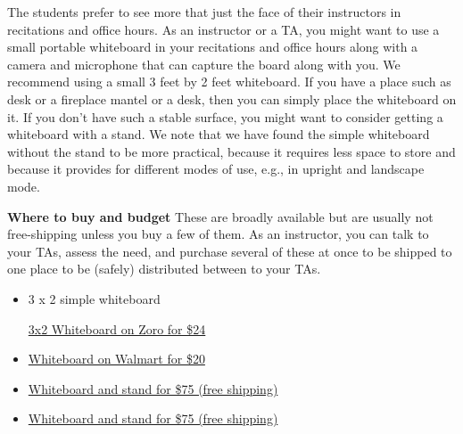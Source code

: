 \begin{gram}[Whiteboards]

The students prefer to see more that just the face of their
instructors in recitations and office hours. 
%
As an instructor or a TA, you might want to use a small portable
whiteboard in your recitations and office hours along with a camera
and microphone that can capture the board along with you. 
%
We recommend using a small 3 feet by 2 feet whiteboard.  
%
If you have a place such as desk or a fireplace mantel or a desk, then
you can simply place the whiteboard on it.  If you don't have such a
stable surface, you might want to consider getting a whiteboard with a
stand.
%
We note that we have found the simple whiteboard without the stand to
be more practical, because it requires less space to store and because
it provides for different modes of use, e.g., in upright and landscape
mode.


\textbf{Where to buy and budget}
These are broadly available but are usually not free-shipping unless you buy a few of them.  As an instructor,  you can talk to your TAs, assess the need, and purchase several of these at once to be shipped to one place to be (safely) distributed between to your TAs.
%

\begin{itemize}
\item
3 x 2 simple whiteboard

\href{https://www.zoro.com/zoro-select-dry-erase-board-36-w-silver-1nup9/i/G1291367/}{3x2
  Whiteboard on Zoro for \$24}

\item
\href{https://www.walmart.com/ip/Universal-Melamine-Dry-Erase-Board-36-x-24-Satin-Finished-Aluminum-Frame/21794195?wmlspartner=wlpa&selectedSellerId=1194&&adid=22222222227015737388&wl0=&wl1=g&wl2=c&wl3=52438033391&wl4=pla-83993817911&wl5=1025202&wl6=&wl7=&wl8=&wl9=pla&wl10=112550058&wl11=online&wl12=21794195&veh=sem&gclid=Cj0KCQjwhIP6BRCMARIsALu9Lfmsq_QIRmgF0rbJxUlILrtcELAuduVKI6z9GdzLxIafjLXdwYfXkmMaAoogEALw_wcB}
{Whiteboard on Walmart for \$20}

\item 
\href{https://www.shoplet.com/Universal-Adjustable-White-Board-Easel/UNV43033/spdv?pt=rk_frg_pla&gclid=Cj0KCQjwvvj5BRDkARIsAGD9vlIAZ8S65M9rY3gJkgpDk6kzZXPSJ-ljV9qVFojSsax5k88zKntEyP0aAuOHEALw_wcB}
{Whiteboard and stand for \$75 (free shipping)}

\item
\href{https://www.officesupply.com/office-supplies/boards-easels/boards/easel-boards/universal-erase-easel-board-easel-height-board-white-silver/p192673.html?ref=pla&utm_source=google&utm_medium=cpc&adpos=&scid=scplp192673&sc_intid=192673&gclid=Cj0KCQjwhIP6BRCMARIsALu9LfmKVfLex71VAT_aU8G5FnQ7ULqQ4m__EUZgIeTURj1PjGfqEOdedvcaAux8EALw_wcB}
{Whiteboard and stand for \$75 (free shipping)}

\end{itemize}

\end{gram}

